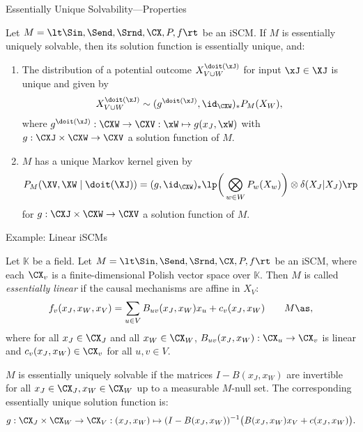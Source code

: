 \begin{frame}{Essentially Unique Solvability---Properties}
\begin{Thm}[\ref{thm:scm_essentially_unique_solvability_implies}]
  Let $M = \lt \Sin, \Send, \Srnd, \CX, P, f \rt$ be an iSCM.
  If $M$ is essentially uniquely solvable, then its solution function is essentially unique, and:
  \begin{enumerate}
    \item The distribution of a potential outcome $X^{\doit(\xJ)}_{V\cup W}$ for input $\xJ\in\XJ$ is unique and given by 
      $$X_{V\cup W}^{\doit(\xJ)} \sim (g^{\doit(\xJ)},\id_{\CXW})_* P_M(X_W),$$
      where $g^{\doit(\xJ)} : \CXW \to \CXV : \xW \mapsto g(x_J,\xW)$ with $g : \CXJ \times \CXW \to \CXV$ a solution function of $M$.
    \item $M$ has a unique Markov kernel given by
      $$P_{M}(\XV,\XW \mid\doit(\XJ)) = (g,\id_{\CXW})_* \lp \bigg( \bigotimes_{w\in W} P_w(X_w) \bigg) \otimes \delta(X_J|X_J) \rp$$
      for $g : \CXJ \times \CXW \to \CXV$ a solution function of $M$.
  \end{enumerate}
\end{Thm}
\end{frame}

\begin{frame}{Example: Linear iSCMs}
\begin{Def}[\ref{def:linear_scms}]
Let $\mathbb{K}$ be a field.
Let $M=\lt \Sin, \Send, \Srnd, \CX, P, f \rt$ be an iSCM, where each $\CX_v$ is a finite-dimensional Polish vector space over $\mathbb{K}$.
Then $M$ is called \emph{essentially linear} if the causal mechanisms are affine in $X_V$:
$$
  f_v(x_J,x_W,x_V) = \sum_{u\in V} B_{uv}(x_J,x_W) x_u + c_v(x_J,x_W) \qquad M\as,
$$
where for all $x_J \in \CX_J$ and all $x_W \in \CX_W$, $B_{uv}(x_J,x_W) : \CX_u \to \CX_v$ is linear and $c_v(x_J,x_W) \in \CX_v$ for all $u,v \in V$.
\end{Def}
\begin{Prp}[\ref{prp:linear_scms}]
$M$ is essentially uniquely solvable if the matrices $I-B(x_J,x_W)$ are invertible for all $x_J \in \CX_J, x_W \in \CX_W$ up to a measurable $M$-null set.
The corresponding essentially unique solution function is:
\small $$g : \CX_J \times \CX_W \to \CX_V : (x_J,x_W) \mapsto (I - B(x_J,x_W))^{-1} \big(B(x_J,x_W) x_V + c(x_J,x_W)\big).$$
\end{Prp}
\end{frame}

